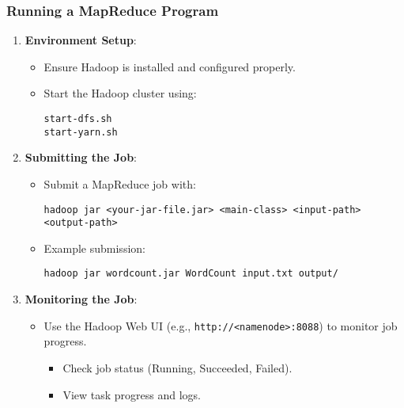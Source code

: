 \documentclass[aspectratio=169]{beamer}
\begin{document}
\begin{frame}[fragile]
    \frametitle{Running a MapReduce Program}
    \begin{enumerate}
        \item \textbf{Environment Setup}:
        \begin{itemize}
            \item Ensure Hadoop is installed and configured properly.
            \item Start the Hadoop cluster using:
            \begin{lstlisting}
start-dfs.sh 
start-yarn.sh
            \end{lstlisting}
        \end{itemize}
        \item \textbf{Submitting the Job}:
        \begin{itemize}
            \item Submit a MapReduce job with:
            \begin{lstlisting}
hadoop jar <your-jar-file.jar> <main-class> <input-path> <output-path>
            \end{lstlisting}
            \item Example submission:
            \begin{lstlisting}
hadoop jar wordcount.jar WordCount input.txt output/
            \end{lstlisting}
        \end{itemize}
        \item \textbf{Monitoring the Job}:
        \begin{itemize}
            \item Use the Hadoop Web UI (e.g., \texttt{http://<namenode>:8088}) to monitor job progress.
            \begin{itemize}
                \item Check job status (Running, Succeeded, Failed).
                \item View task progress and logs.
            \end{itemize}
        \end{itemize}
    \end{enumerate}
\end{frame}
\end{document}
